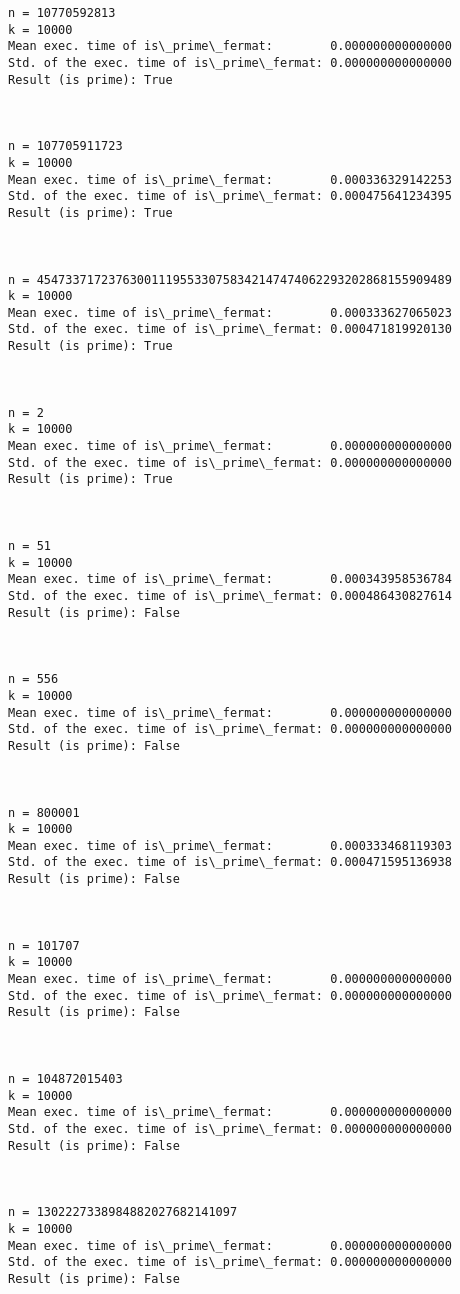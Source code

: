 \documentclass[11pt]{article}
\begin{document}
\begin{Verbatim}[commandchars=\\\{\}]
n = 10770592813
k = 10000
Mean exec. time of is\_prime\_fermat:        0.000000000000000
Std. of the exec. time of is\_prime\_fermat: 0.000000000000000
Result (is prime): True



n = 107705911723
k = 10000
Mean exec. time of is\_prime\_fermat:        0.000336329142253
Std. of the exec. time of is\_prime\_fermat: 0.000475641234395
Result (is prime): True



n = 4547337172376300111955330758342147474062293202868155909489
k = 10000
Mean exec. time of is\_prime\_fermat:        0.000333627065023
Std. of the exec. time of is\_prime\_fermat: 0.000471819920130
Result (is prime): True



n = 2
k = 10000
Mean exec. time of is\_prime\_fermat:        0.000000000000000
Std. of the exec. time of is\_prime\_fermat: 0.000000000000000
Result (is prime): True



n = 51
k = 10000
Mean exec. time of is\_prime\_fermat:        0.000343958536784
Std. of the exec. time of is\_prime\_fermat: 0.000486430827614
Result (is prime): False



n = 556
k = 10000
Mean exec. time of is\_prime\_fermat:        0.000000000000000
Std. of the exec. time of is\_prime\_fermat: 0.000000000000000
Result (is prime): False



n = 800001
k = 10000
Mean exec. time of is\_prime\_fermat:        0.000333468119303
Std. of the exec. time of is\_prime\_fermat: 0.000471595136938
Result (is prime): False



n = 101707
k = 10000
Mean exec. time of is\_prime\_fermat:        0.000000000000000
Std. of the exec. time of is\_prime\_fermat: 0.000000000000000
Result (is prime): False



n = 104872015403
k = 10000
Mean exec. time of is\_prime\_fermat:        0.000000000000000
Std. of the exec. time of is\_prime\_fermat: 0.000000000000000
Result (is prime): False



n = 1302227338984882027682141097
k = 10000
Mean exec. time of is\_prime\_fermat:        0.000000000000000
Std. of the exec. time of is\_prime\_fermat: 0.000000000000000
Result (is prime): False




\end{Verbatim}
\end{document}
